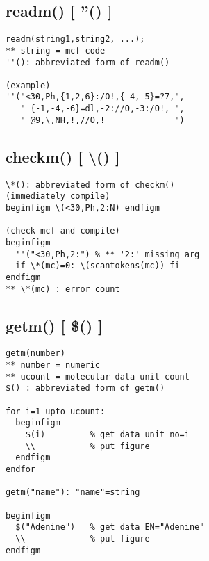 \documentclass[a4paper]{article}
\begin{document}
\subsection{readm() [ ''() ]}
%
%
\begin{verbatim}
readm(string1,string2, ...);
** string = mcf code
''(): abbreviated form of readm()

(example)
''("<30,Ph,{1,2,6}:/O!,{-4,-5}=?7,",
   " {-1,-4,-6}=dl,-2://O,-3:/O!, ",
   " @9,\,NH,!,//O,!              ")
\end{verbatim}
\subsection{checkm() [ \textbackslash*(){ }]}
%
\index{\textbackslash*()}%
\begin{verbatim}
\*(): abbreviated form of checkm()
(immediately compile)
beginfigm \(<30,Ph,2:N) endfigm

(check mcf and compile)
beginfigm
  ''("<30,Ph,2:") % ** '2:' missing arg
  if \*(mc)=0: \(scantokens(mc)) fi
endfigm
** \*(mc) : error count
\end{verbatim}
\quad
{}
\subsection{getm() [ \$() ]}
%
%
\index{\$()}%
\begin{verbatim}
getm(number)
** number = numeric
** ucount = molecular data unit count
$() : abbreviated form of getm()

for i=1 upto ucount:
  beginfigm
    $(i)         % get data unit no=i
    \\           % put figure
  endfigm
endfor

getm("name"): "name"=string

beginfigm
  $("Adenine")   % get data EN="Adenine"
  \\             % put figure
endfigm
\end{verbatim}
\end{document}
